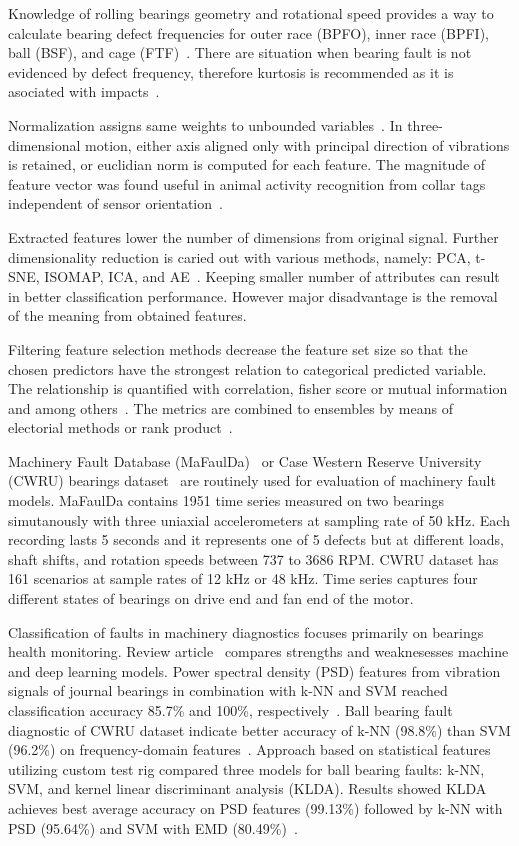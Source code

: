 \documentclass{llncs}
\begin{document}
Knowledge of rolling bearings geometry and rotational speed provides a way to calculate bearing defect frequencies for outer race (BPFO), inner race (BPFI), ball (BSF), and cage (FTF)~\cite{mohanty_machinery_2015, ziaran_technicka_2013}. There are situation when bearing fault is not evidenced by defect frequency, therefore kurtosis is recommended as it is asociated with impacts~\cite{brito_fault_2021}.

Normalization assigns same weights to unbounded variables~\cite{zheng_feature_2018}. In three-dimensional motion, either axis aligned only with principal direction of vibrations is retained, or euclidian norm is computed for each feature. The magnitude of feature vector was found useful in animal activity recognition from collar tags independent of sensor orientation~\cite{kamminga_robust_2018}. 

Extracted features lower the number of dimensions from original signal. Further dimensionality reduction is caried out with various methods, namely: PCA, t-SNE, ISOMAP, ICA, and AE~\cite{brito_fault_2021}. Keeping smaller number of attributes can result in better classification performance. However major disadvantage is the removal of the meaning from obtained features. 

Filtering feature selection methods decrease the feature set size so that the chosen predictors have the strongest relation to categorical predicted variable.
The relationship is quantified with correlation, fisher score or mutual information and among others~\cite{nandi_condition_2019}. The metrics are combined to ensembles by means of electorial methods or rank product~\cite{breitling_rank_2004}.

Machinery Fault Database (MaFaulDa)~\cite{mafaulda_dataset} or Case Western Reserve University (CWRU) bearings dataset~\cite{cwru_dataset} are routinely used for evaluation of machinery fault models. MaFaulDa contains 1951 time series measured on two bearings 
simutanously with three uniaxial accelerometers at sampling rate of 50 kHz. Each recording lasts 5 seconds and it represents one of 5 defects but at different loads, shaft shifts, and rotation speeds between 737 to 3686 RPM. CWRU dataset has 161 scenarios at sample rates of 12 kHz or 48 kHz. Time series captures four different states of bearings on drive end and fan end of the motor.

Classification of faults in machinery diagnostics focuses primarily on bearings health monitoring. Review article~\cite{sheng_review_2020} compares strengths and weaknesesses machine and deep learning models. Power spectral density (PSD) features from vibration signals of journal bearings in combination with k-NN and SVM reached classification accuracy 85.7\% and 100\%, respectively~\cite{moosavian_appropriate_2012}. Ball bearing fault diagnostic of CWRU dataset indicate better accuracy of k-NN (98.8\%) than SVM (96.2\%) on frequency-domain features~\cite{jamil_feature-based_2021}. Approach based on statistical features utilizing custom test rig compared three models for ball bearing faults: k-NN, SVM, and kernel linear discriminant analysis (KLDA). Results showed KLDA achieves best average accuracy on PSD features (99.13\%) followed by k-NN with PSD (95.64\%) and SVM with EMD (80.49\%)~\cite{altaf_new_2022}. 
\end{document}
